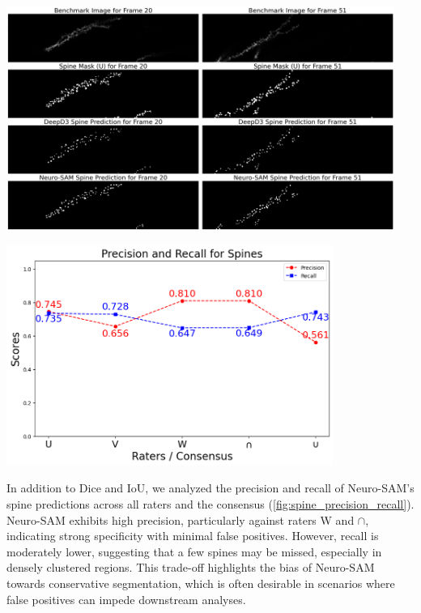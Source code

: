 \begin{center}
\includegraphics[width=0.95\textwidth]{figures/42_spine_seg_per_frame.png}
\label{fig:spine_seg_per_frame}
\end{center}

\begin{center}
\includegraphics[width=0.8\textwidth]{figures/43_spine_precision_recall.png}
\label{fig:spine_precision_recall}
\end{center}


In addition to Dice and \gls{IoU}, we analyzed the precision and recall of Neuro-\gls{SAM}’s spine predictions across all raters and the consensus (\autoref{fig:spine_precision_recall}). Neuro-\gls{SAM} exhibits high precision, particularly against raters W and $\cap$, indicating strong specificity with minimal false positives. However, recall is moderately lower, suggesting that a few spines may be missed, especially in densely clustered regions. This trade-off highlights the bias of Neuro-\gls{SAM} towards conservative segmentation, which is often desirable in scenarios where false positives can impede downstream analyses.

